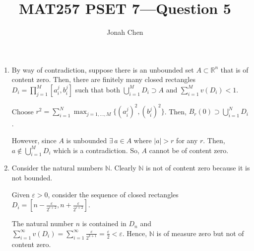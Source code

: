 \documentclass{exam}
\title{MAT257 PSET 7---Question 5}
\author{Jonah Chen}
\numberwithin{equation}{section}
\newcommand{\R}{\mathbb{R}}
\begin{document}
\sffamily
\maketitle
    \begin{enumerate}[label=(\alph*)]
        \item By way of contradiction, suppose there is an unbounded set $A\subset\R^n$ that is of content zero. Then, there are finitely many closed rectangles $D_i=\prod_{j=1}^M[a_i^j,b_i^j]$ such that both $\bigcup_{i=1}^M D_i\supset A$ and $\sum_{i=1}^Mv(D_i)<1$. 
        
        Choose $r^2=\sum_{i=1}^N\max_{j=1,\dots,M}\{(a_i^j)^2,(b_i^j)^2\}$. Then, $B_r(0)\supset\bigcup_{i=1}^N D_i$.

        However, since $A$ is unbounded $\exists\, a\in A$ where $|a|>r$ for any $r$. Then, $a\notin \bigcup_{i=1}^M D_i$ which is a contradiction. So, $A$ cannot be of content zero.

        \item Consider the natural numbers $\mathbb N$. Clearly $\mathbb N$ is not of content zero because it is not bounded.
        
        Given $\varepsilon>0$, consider the sequence of closed rectangles $D_i=[n-\frac{\varepsilon}{2^{i+2}},n+\frac{\varepsilon}{2^{i+2}}]$. 
        
        The natural number $n$ is contained in $D_n$ and $\sum_{i=1}^\infty v(D_i)=\sum_{i=1}^\infty \frac{\varepsilon}{2^{k+1}}=\frac{\varepsilon}{2}<\varepsilon$. Hence, $\mathbb N$ is of measure zero but not of content zero.
    \end{enumerate}
\end{document}
